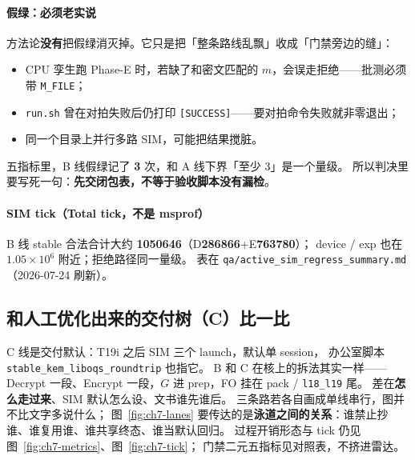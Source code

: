 \documentclass[UTF8,a4paper,11pt]{ctexart}
\theoremstyle{definition}
\theoremstyle{plain}
\theoremstyle{remark}
\numberwithin{figure}{section}
\numberwithin{table}{section}
\begin{document}
\paragraph{假绿：必须老实说}
方法论\textbf{没有}把假绿消灭掉。它只是把「整条路线乱飘」收成「门禁旁边的缝」：
\begin{itemize}
  \item CPU 孪生跑 Phase-E 时，若缺了和密文匹配的 $m$，会误走拒绝——批测必须带 \texttt{M\_FILE}；
  \item \texttt{run.sh} 曾在对拍失败后仍打印 \texttt{[SUCCESS]}——要对拍命令失败就非零退出；
  \item 同一个目录上并行多路 SIM，可能把结果搅脏。
\end{itemize}
五指标里，B 线假绿记了 \textbf{3} 次，和 A 线下界「至少 3」是一个量级。
所以判决里要写死一句：\textbf{先交闭包表，不等于验收脚本没有漏检}。

\paragraph{SIM tick（Total tick，不是 msprof）}
B 线 stable 合法合计大约 \textbf{1050646}（D\textbf{286866}+E\textbf{763780}）；
device / exp 也在 $1.05\times 10^{6}$ 附近；拒绝路径同一量级。
表在 \texttt{qa/active\_sim\_regress\_summary.md}（2026-07-24 刷新）。

\subsection{和人工优化出来的交付树（C）比一比}
\label{sec:forward-vs-main}

C 线是交付默认：T19i 之后 SIM 三个 launch，默认单 session，
办公室脚本 \texttt{stable\_kem\_liboqs\_roundtrip} 也指它。
B 和 C 在核上的拆法其实一样——Decrypt 一段、Encrypt 一段，$G$ 进 prep，FO 挂在 pack / \texttt{l18\_l19} 尾。
差在\textbf{怎么走过来}、SIM 默认怎么设、文书谁先谁后。
三条路若各自画成单线串行，图并不比文字多说什么；
图~\ref{fig:ch7-lanes} 要传达的是\textbf{泳道之间的关系}：谁禁止抄谁、谁复用谁、谁共享终态、谁当默认回归。
过程开销形态与 tick 仍见图~\ref{fig:ch7-metrics}、图~\ref{fig:ch7-tick}；
门禁二元五指标见对照表，不挤进雷达。
\end{document}
